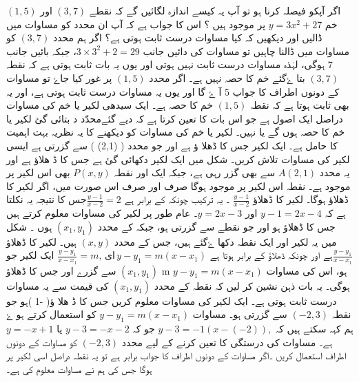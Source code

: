 اگر آپکو فیصلہ کرنا ہو تو آپ یہ کیسے اندازہ لگائیں گے کہ نقطے \( (3,7)   \)  اور  \(    (1,5)   \) خم \( y=3x^2 +27 \) پر موجود ہیں ؟ اس کا جواب ہے کہ آپ ان محدد کو مساوات میں ڈالیں اور دیکھیں کہ کیا مساوات درست ثابت ہوتی ہے؟
اگر ہم محدد \( (3,7)   \)  کو مساوات میں ڈالنا چاہیں تو مساوات کی دائیں جانب \( 3 \times 3^2 +2 = 29 \)، جبکہ بائیں جانب 7 ہوگی، لہٰذہ مساوات درست ثابت نہیں ہوتی اور یوں یہ بات ثابت ہوتی ہے کہ نقطہ \( (3,7)   \)  بتا ۓگئے خم کا حصہ نہیں ہے۔
اگر محدد \(    (1,5)   \)  پر غور کیا جاۓ تو مساوات  کے دونوں اطراف کا جواب 5 آ ۓ گا اور یوں یہ مساوات درست ثابت ہوتی ہے، اور یہ بھی ثابت ہوتا ہے کہ نقطہ \(    (1,5)   \)  خم کا حصہ ہے۔ 
ایک سیدھی لکیر یا خم کی مساوات دراصل ایک اصول ہے جو اس بات کا تعین کرتا ہے کہ دیے گئےمحدّد د بتائی گئ لکیر یا خم کا حصہ ہوں گے یا نہیں۔
لکیر یا خم کی مساوات کو دیکھنے کا یہ نظریہ بہت اہمیت کا حامل ہے۔
ایک لکیر جس کا ڈھلا ؤ   ہے اور جو محدد (   (2,1)   ) سے گزرتی ہے ایسی لکیر کی مساوات تلاش کریں۔
شکل  میں ایک لکیر دکھائی گئ ہے جس کا ڈ ھلاؤ   ہے  اور یہ محدد \( A (2,1)  \)  سے بھی گزر رہی ہے، جبکہ ایک اور نقطہ \(   P (x,y)\)  بھی اس لکیر پر موجود ہے۔ نقطہ     اس لکیر پر موجود ہوگا صرف اور صرف اس صورت میں، اگر لکیر     کا   ڈھلاؤ   ہوگا۔ 
لکیر    کا ڈھلاؤ  \( \frac{y-1}{x-2} \) ۔ یہ ترکیب چونکہ  کے برابر ہے   \( \frac{y-1}{x-2} =2 \)جس کا نتیجہ یہ نکلتا ہے کہ \( y-1=2x-4 \) اور \(y=2x-3\)۔
عام طور پر لکیر کی مساوات معلوم کرتے ہیں جس کا ڈھلاؤ   ہو اور جو نقطے   سے گزرتی ہو، جبکہ  کے محدد  \(   (x_{1},y_{1})  \) ہوں ۔
شکل  میں یہ لکیر اور ایک نقطہ    دکھا ۓگئے  ہیں، جس کے محدد  \(     (x,y)\) ہیں۔ لکیر       کا  ڈھلاؤ \( \frac{y-y_1}{x-x_1} \)ہے اور چونکہ ڈھلاؤ  کے برابر ہوتا ہے \( \frac{y-y_1}{x-x_1} =m, \, یا \, y-y_1 = m(x-x_1) \)
 ایک لکیر جو \(   (x_{1},y_{1})  \) سے گزرے اور جس کا ڈھلاؤ m ہو، اس کی مساوات \( y-y_1 = m(x-x_1) \) ہوگی۔
یہ بات ذہن نشین کر لیں کہ نقطہ  کے محدد \(   (x_{1},y_{1})  \) کی قیمت سے یہ مساوات درست ثابت ہوتی ہے۔
ایک لکیر کی مساوات معلوم کریں جس کا ڈ ھلا ؤ( -1 )ہو جو نقطہ \( (-2,3) \) سے گزرتی ہو۔
مساوات \( y-y_1 = m(x-x_1) \) کو استعمال کرتے ہو ۓ ہم کہہ سکتے ہیں کہ \( y-3=-1(x-(-2)), \) جو کہ \( y-3=-x-2 \) یا \(y=-x+1\) ہے۔  مساوات کی درستگی کا تعین کرنے کے لیے محدد \( (-2,3) \) کو مساوات کے دونوں اطراف استعمال کریں ۔اگر مساوات کے دونوں اطراف کا جواب برابر ہے تو یہ نقطہ دراصل اسی لکیر پر ہوگا جس کی ہم نے  مساوات معلوم کی ہے۔
